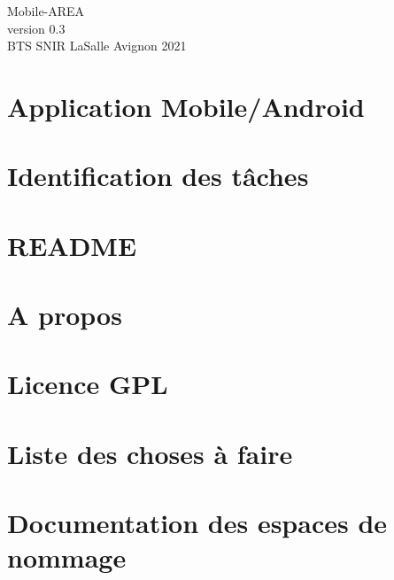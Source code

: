 \documentclass[twoside]{article}
\newcommand{\+}{\discretionary{\mbox{\scriptsize$\hookleftarrow$}}{}{}}
\begin{document}
\hypersetup{pageanchor=false,
             bookmarksnumbered=true,
             pdfencoding=unicode
            }
\begin{titlepage}
\vspace*{7cm}

\begin{center}%
{\LARGE Mobile-\/\+A\+R\+EA}\\
\vspace*{1cm}
{\large version 0.\+3}\\
\vspace*{1cm}
{\large B\+T\+S S\+N\+I\+R La\+Salle Avignon 2021}\\
\end{center}
\end{titlepage}
\tableofcontents
{}
\hypersetup{pageanchor=true}

\section{Application Mobile/\+Android}
\label{index}\hypertarget{index}{}
\section{Identification des tâches}
\label{md_planification}

\section{R\+E\+A\+D\+ME}
\label{page__r_e_a_d_m_e}

\section{A propos}
\label{page_about}

\section{Licence G\+PL}
\label{page_licence}

\section{Liste des choses à faire}
\label{todo}

\section{Documentation des espaces de nommage}



\end{document}
